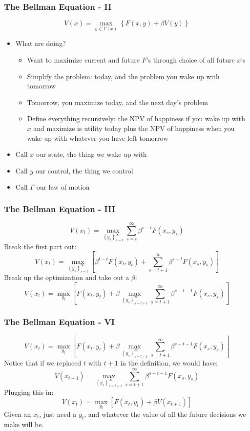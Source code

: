 \documentclass{beamer}
\begin{document}
\begin{frame}
\frametitle[alignment=center]{The Bellman Equation - II}
$$V(x)=\underset{y\in\Gamma(x)}{\max}\left\{F(x,y)+\beta V(y)\right\}$$
\begin{itemize}
\item What are doing?
\begin{itemize}
\item Want to maximize current and future $F$'s through choice of all future $x$'s
\smallskip
\item Simplify the problem: today, and the problem you wake up with tomorrow
\smallskip
\item Tomorrow, you maximize today, and the next day's problem
\smallskip
\item Define everything recursively: the NPV of happiness if you wake up with $x$ and maximize is utility today plus the NPV of happiness when you wake up with whatever you have left tomorrow
\end{itemize}
\item Call $x$ our state, the thing we wake up with
\smallskip
\item Call $y$ our control, the thing we control
\smallskip
\item Call $\Gamma$ our law of motion
\end{itemize}
\end{frame}

\begin{frame}
\frametitle[alignment=center]{The Bellman Equation - III}
$$V(x_t)=\underset{\left\{y_s\right\}_{s=t}^\infty}{\max}\sum_{s=t}^\infty \beta^{s-t}F(x_s,y_s)$$
Break the first part out:
$$V(x_t)=\underset{\left\{y_s\right\}_{s=t}^\infty}{\max}\left[\beta^{t-t}F(x_t,y_t)+\sum_{s=t+1}^\infty \beta^{s-t}F(x_s,y_s)\right]$$
Break up the optimization and take out a $\beta$:
$$V(x_t)=\underset{y_t}{\max} \left[F(x_t,y_t)+\beta \underset{\left\{y_s\right\}_{s=t+1}^\infty}{\max}\sum_{s=t+1}^\infty \beta^{s-t-1}F(x_s,y_s)\right]$$
 \end{frame}

\begin{frame}
\frametitle[alignment=center]{The Bellman Equation - VI}
$$V(x_t)=\underset{y_t}{\max} \left[F(x_t,y_t)+\beta \underset{\left\{y_s\right\}_{s=t+1}^\infty}{\max}\sum_{s=t+1}^\infty \beta^{s-t-1}F(x_s,y_s)\right]$$
Notice that if we replaced $t$ with $t+1$ in the definition, we would have:
$$V(x_{t+1})=\underset{\left\{y_s\right\}_{s=t+1}^\infty}{\max}\sum_{s=t+1}^\infty \beta^{s-t-1}F(x_s,y_s)$$
Plugging this in:
$$V(x_t)=\underset{y_t}{\max} \left[F(x_t,y_t)+\beta V(x_{t+1})\right]$$
Given an $x_t$, just need a $y_t$, and whatever the value of all the future decisions we make will be.
 \end{frame}
\end{document}
